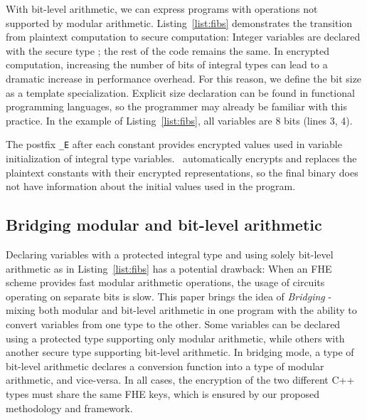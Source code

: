 With bit-level arithmetic, we can express programs with operations not supported by modular arithmetic.
Listing~\ref{list:fibs} demonstrates the transition from plaintext computation to secure computation: Integer variables are declared with the secure type \secuint; the rest of the code remains the same.
In encrypted computation, increasing the number of bits of integral types can lead to a dramatic increase in performance overhead.
For this reason, we define the bit size as a template specialization.
Explicit size declaration can be found in functional programming languages, so the programmer may already be familiar with this practice.
In the example of Listing~\ref{list:fibs}, all variables are 8 bits (lines 3, 4).

The postfix {\tt{}\_E} after each constant provides encrypted values used in variable initialization of integral type variables.
\eee\ automatically encrypts and replaces the plaintext constants with their encrypted representations, so the final binary does not have information about the initial values used in the program. 




\subsection{Bridging modular and bit-level arithmetic}\label{ss:bridging}

Declaring variables with a protected integral type and using solely bit-level arithmetic as in Listing~\ref{list:fibs} has a potential drawback: When an FHE scheme provides fast modular arithmetic operations, the usage of circuits operating on separate bits is slow. This paper brings the  idea of 
\textit{Bridging} - mixing both modular and bit-level arithmetic in one program with the ability to convert variables from one type to the other. %
Some variables can be declared using a protected type supporting only modular arithmetic, while others with another secure type supporting bit-level arithmetic. In bridging mode, a type of bit-level arithmetic declares a conversion function into a type of modular arithmetic, and vice-versa.
In all cases, the encryption of the two different C++ types must share the same FHE keys, which is ensured by our proposed methodology and framework. 

